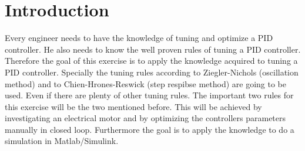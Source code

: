 \section{Introduction}
Every engineer needs to have the knowledge of tuning and optimize a PID controller. He also needs to know the well proven rules of tuning a PID controller. Therefore the goal of this exercise is to apply the knowledge acquired to tuning a PID controller. Specially the tuning rules according to Ziegler-Nichols (oscillation method) and to Chien-Hrones-Reswick (step respibse method) are going to be used. Even if there are plenty of other tuning rules. The important two rules for this exercise will be the two mentioned before. This will be achieved by investigating an electrical motor and by optimizing the controllers parameters manually in closed loop. Furthermore the goal is to apply the knowledge to do a simulation in Matlab/Simulink.


